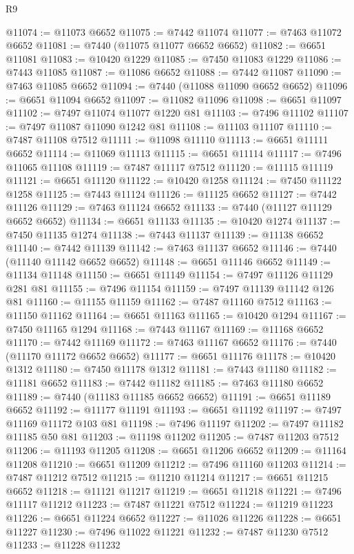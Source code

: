 \begin{lexlean}{R9}
\begin{coremodule}
{{{{{{{{{{{{{{{{{{{{{{{{{{{{{{{{{{{{{{{{{{{{{{{{{{{{{{{{{{{{{{{{{{{{{{{{{{{{{{{{{{{{@11074 := @11073 @6652
@11075 := @7442 @11074
@11077 := @7463 @11072 @6652
@11081 := @7440 (@11075 @11077 @6652 @6652)
@11082 := @6651 @11081
@11083 := @10420 @1229
@11085 := @7450 @11083 @1229
@11086 := @7443 @11085
@11087 := @11086 @6652
@11088 := @7442 @11087
@11090 := @7463 @11085 @6652
@11094 := @7440 (@11088 @11090 @6652 @6652)
@11096 := @6651 @11094 @6652
@11097 := @11082 @11096
@11098 := @6651 @11097
@11102 := @7497 @11074 @11077 @1220 @81
@11103 := @7496 @11102
@11107 := @7497 @11087 @11090 @1242 @81
@11108 := @11103 @11107
@11110 := @7487 @11108 @7512
@11111 := @11098 @11110
@11113 := @6651 @11111 @6652
@11114 := @11069 @11113
@11115 := @6651 @11114
@11117 := @7496 @11065 @11108
@11119 := @7487 @11117 @7512
@11120 := @11115 @11119
@11121 := @6651 @11120
@11122 := @10420 @1258
@11124 := @7450 @11122 @1258
@11125 := @7443 @11124
@11126 := @11125 @6652
@11127 := @7442 @11126
@11129 := @7463 @11124 @6652
@11133 := @7440 (@11127 @11129 @6652 @6652)
@11134 := @6651 @11133
@11135 := @10420 @1274
@11137 := @7450 @11135 @1274
@11138 := @7443 @11137
@11139 := @11138 @6652
@11140 := @7442 @11139
@11142 := @7463 @11137 @6652
@11146 := @7440 (@11140 @11142 @6652 @6652)
@11148 := @6651 @11146 @6652
@11149 := @11134 @11148
@11150 := @6651 @11149
@11154 := @7497 @11126 @11129 @281 @81
@11155 := @7496 @11154
@11159 := @7497 @11139 @11142 @126 @81
@11160 := @11155 @11159
@11162 := @7487 @11160 @7512
@11163 := @11150 @11162
@11164 := @6651 @11163
@11165 := @10420 @1294
@11167 := @7450 @11165 @1294
@11168 := @7443 @11167
@11169 := @11168 @6652
@11170 := @7442 @11169
@11172 := @7463 @11167 @6652
@11176 := @7440 (@11170 @11172 @6652 @6652)
@11177 := @6651 @11176
@11178 := @10420 @1312
@11180 := @7450 @11178 @1312
@11181 := @7443 @11180
@11182 := @11181 @6652
@11183 := @7442 @11182
@11185 := @7463 @11180 @6652
@11189 := @7440 (@11183 @11185 @6652 @6652)
@11191 := @6651 @11189 @6652
@11192 := @11177 @11191
@11193 := @6651 @11192
@11197 := @7497 @11169 @11172 @103 @81
@11198 := @7496 @11197
@11202 := @7497 @11182 @11185 @50 @81
@11203 := @11198 @11202
@11205 := @7487 @11203 @7512
@11206 := @11193 @11205
@11208 := @6651 @11206 @6652
@11209 := @11164 @11208
@11210 := @6651 @11209
@11212 := @7496 @11160 @11203
@11214 := @7487 @11212 @7512
@11215 := @11210 @11214
@11217 := @6651 @11215 @6652
@11218 := @11121 @11217
@11219 := @6651 @11218
@11221 := @7496 @11117 @11212
@11223 := @7487 @11221 @7512
@11224 := @11219 @11223
@11226 := @6651 @11224 @6652
@11227 := @11026 @11226
@11228 := @6651 @11227
@11230 := @7496 @11022 @11221
@11232 := @7487 @11230 @7512
@11233 := @11228 @11232
}}}}}}}}}}}}}}}}}}}}}}}}}}}}}}}}}}}}}}}}}}}}}}}}}}}}}}}}}}}}}}}}}}}}}}}}}}}}}}}}}}}}
\end{coremodule}
\end{lexlean}
